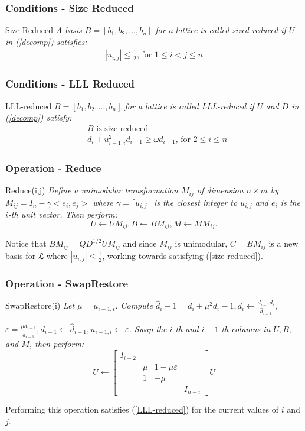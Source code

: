 \documentclass{beamer}
\begin{document}
\begin{frame}
\frametitle{Conditions - Size Reduced}
\begin{block}{Size-Reduced\cite{OriginalLLL}}\textit{ A basis $B=[b_1,b_2,\ldots,b_n]$ for a lattice is called sized-reduced if $U$ in (\ref{decomp}) satisfies:}
\begin{eqnarray}
|u_{i,j}|\leq\frac{1}{2}\text{, for }1\leq i < j \leq n \label{size-reduced}
\end{eqnarray}
\end{block}
\end{frame}
\begin{frame}
\frametitle{Conditions - LLL Reduced}
\begin{block}{LLL-reduced\cite{OriginalLLL}} \textit{$B=[b_1,b_2,\ldots,b_n]$ for a lattice is called LLL-reduced if $U$ and $D$ in (\ref{decomp}) satisfy:}
\begin{eqnarray}
&B\text{ is size reduced}\\
&d_i+u^2_{i-1,i}d_{i-1}\geq \omega d_{i-1}\text{, for }2 \leq i \leq n \label{LLL-reduced}
\end{eqnarray}
\end{block}
\end{frame}

\begin{frame}
\frametitle{Operation - Reduce}
\begin{block}{Reduce(i,j)} \textit{Define a unimodular transformation $M_{ij}$ of dimension $n\times m$ by 
\\$M_{ij}=I_n-\gamma <e_i, e_j>$ where $\gamma=\lceil u_{i,j} \lfloor$ is the closest integer to $u_{i,j}$ and $e_i$ is the $i$-th unit vector. Then perform:}
$$U\leftarrow UM_{ij}, B\leftarrow BM_{ij}, M\leftarrow MM_{ij}.$$
\end{block}
Notice that $BM_{ij}=QD^{1/2}UM_{ij}$ and since $M_{ij}$ is unimodular, $C=BM_{ij}$ is a new basis for $\mathfrak{L}$ where $|u_{i,j}|\leq \frac{1}{2}$, working towards satisfying (\ref{size-reduced}).\cite{LuoQiaoParallelLLL}
\end{frame}

\begin{frame}
\frametitle{Operation - SwapRestore}
\begin{block}{SwapRestore(i)} \textit{Let $\mu=u_{i-1,i}$. Compute $\hat{d}_i-1=d_i+\mu^2 d_i-1, d_i\leftarrow \frac{d_{i-1}d_i}{\hat{d}_{i-1}},$}

\textit{$\varepsilon=\frac{\mu d_{i-1}}{\hat{d}_{i-1}},d_{i-1}\leftarrow \hat{d}_{i-1}, u_{i-1,i}\leftarrow \varepsilon$. Swap the $i$-th and $i-1$-th columns in $U,B,$ and $M$, then perform:}
$$U \leftarrow \left[
\begin{array}{cccc}
I_{i-2} & & &\\
&\mu & 1-\mu \varepsilon &\\
&1   &  -\mu &\\
& & & I_{n-i}
\end{array}\right]U $$
\end{block}
Performing this operation satisfies (\ref{LLL-reduced}) for the current values of $i$ and $j$. \cite{LuoQiaoParallelLLL}
\end{frame}
\end{document}
